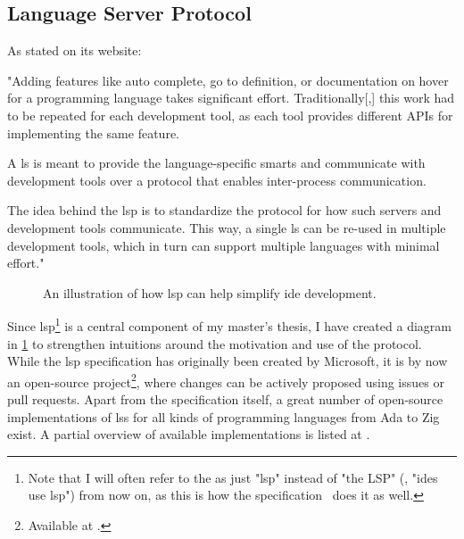 \documentclass[../thesis]{subfiles}
\begin{document}
\subsection{Language Server Protocol}\label{subsec:lsp}

As stated on its website:
\begin{displayquote}
	"Adding features like auto complete, go to definition, or documentation on hover for a programming language takes significant effort. Traditionally[,] this work had to be repeated for each development tool, as each tool provides different APIs for implementing the same feature.

	A \gls*{ls} is meant to provide the language-specific smarts and communicate with development tools over a protocol that enables inter-process communication.

	The idea behind the \gls*{lsp} is to standardize the protocol for how such servers and development tools communicate. This way, a single \gls{ls} can be re-used in multiple development tools, which in turn can support multiple languages with minimal effort."~\cite{lsp}
\end{displayquote}

\begin{figure}
	\tikzexternaldisable
	\begin{center}
	\end{center}
	\tikzexternalenable
	\caption{An illustration of how \gls{lsp} can help simplify \gls{ide} development.}\label{fig:lsp}
\end{figure}

\noindent{}Since \gls{lsp}\footnote{%
	Note that I will often refer to the  as just "\gls{lsp}" instead of "the LSP" (\eg, "\glspl{ide} use \gls{lsp}") from now on, as this is how the specification~\cite{lsp} does it as well.
} is a central component of my master's thesis, I have created a diagram in \cref{fig:lsp} to strengthen intuitions around the motivation and use of the protocol.
While the \gls{lsp} specification has originally been created by Microsoft, it is by now an open-source project\footnote{
	Available at .
}, where changes can be actively proposed using issues or pull requests.
Apart from the specification itself, a great number of open-source implementations of \glspl{ls} for all kinds of programming languages from Ada to Zig exist.
A partial overview of available implementations is listed at .
\end{document}
